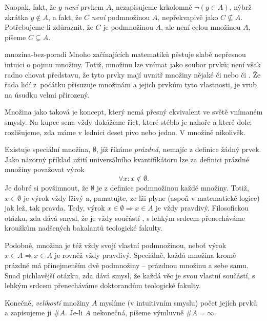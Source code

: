 Naopak, fakt, že $y$ \emph{není} prvkem $A$, nezapisujeme krkolomně $\neg (y \in
A)$, nýbrž zkrátka $y \notin A$, a fakt, že $C$ \emph{není} podmnožinou $A$,
nepřekvapivě jako $C \nsubseteq A$. Potřebujeme-li zdůraznit, že $C$ je
podmnožinou $A$, ale není celou množinou $A$, píšeme $C \subsetneq A$.
\begin{warning}{}{mnozina-bez-poradi}
 Mnoho začínajících matematiků pěstuje slabě nepřesnou intuici o pojmu množiny.
 Totiž, množinu lze vnímat jako soubor prvků; není však radno chovat představu,
 že tyto prvky mají uvnitř množiny nějaké  či  nebo
  či . Že řada lidí z~počátku přisuzuje množinám a
 jejich prvkům tyto vlastnosti, je vrub na úsudku velmi přirozený.

 Množina jako taková je koncept, který nemá přesný ekvivalent ve světě vnímaném
 smysly. Na kupce sena vždy dokážeme říct, které stéblo je nahoře a které dole;
 rozlišujeme, zda máme v lednici deset pivo nebo jedno. V množině nikolivěk.
\end{warning}
Existuje speciální množina, $\emptyset$, jíž říkáme \emph{prázdná}, nemajíc z
definice žádný prvek. Jako názorný příklad užití universálního kvantifikátoru
lze za definici prázdné množiny považovat výrok
\[
 \forall x: x \notin \emptyset.
\]
Je dobré si povšimnout, že $\emptyset$ je z definice podmnožinou každé množiny.
Totiž, $x \in \emptyset$ je výrok vždy lživý a, pamatujte, ze lži plyne (aspoň v
matematické logice) jak lež, tak pravda. Tedy, výrok $x \in \emptyset
\Rightarrow x \in A$ je vždy pravdivý. Filosofickou otázku, zda dává smysl, že
 je vždy součástí , s lehkým srdcem přenecháváme kroužkům
nadšených bakalantů teologické fakulty.

Podobně, množina je též vždy svojí vlastní podmnožinou, neboť výrok $x \in A
\Rightarrow x \in A$ je rovněž vždy pravdivý. Speciálně, každá množina kromě
prázdné má přinejmenším dvě podmnožiny -- prázdnou množinu a sebe samu. Snad
pichlavější otázku, zda dává smysl, že každá věc je svou vlastní součástí, s
lehkým srdcem přenecháváme doktorandům teologické fakulty.

Konečně, \emph{velikostí} množiny $A$ myslíme (v intuitivním smyslu) počet
jejích prvků a zapisujeme ji $\# A$. Je-li $A$ nekonečná, píšeme výmluvně $\# A
= \infty$.
 





